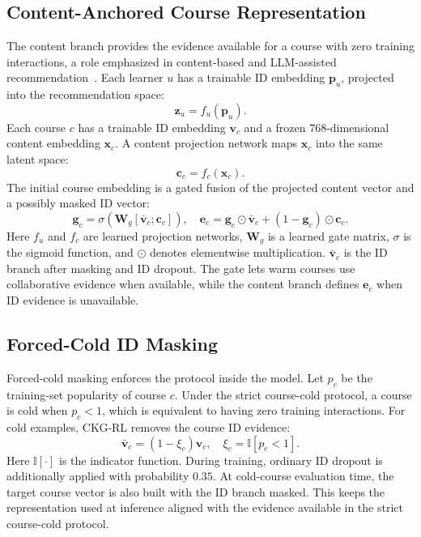 \documentclass[letterpaper]{article}
\begin{document}
\subsection{Content-Anchored Course Representation}
The content branch provides the evidence available for a course with zero training interactions, a role emphasized in content-based and LLM-assisted recommendation~\cite{liu2024once,wu2024llmrec}. Each learner \(u\) has a trainable ID embedding \(\mathbf{p}_u\), projected into the recommendation space:
\begin{equation}
\mathbf{z}_u=f_u(\mathbf{p}_u).
\end{equation}
Each course \(c\) has a trainable ID embedding \(\mathbf{v}_c\) and a frozen 768-dimensional content embedding \(\mathbf{x}_c\). A content projection network maps \(\mathbf{x}_c\) into the same latent space:
\begin{equation}
\mathbf{c}_c=f_c(\mathbf{x}_c).
\end{equation}
The initial course embedding is a gated fusion of the projected content vector and a possibly masked ID vector:
\begin{equation}
\mathbf{g}_c=\sigma\left(\mathbf{W}_g[\bar{\mathbf{v}}_c;\mathbf{c}_c]\right),
\quad
\mathbf{e}_c=\mathbf{g}_c\odot \bar{\mathbf{v}}_c+(1-\mathbf{g}_c)\odot \mathbf{c}_c.
\end{equation}
Here \(f_u\) and \(f_c\) are learned projection networks, \(\mathbf{W}_g\) is a learned gate matrix, \(\sigma\) is the sigmoid function, and \(\odot\) denotes elementwise multiplication. \(\bar{\mathbf{v}}_c\) is the ID branch after masking and ID dropout. The gate lets warm courses use collaborative evidence when available, while the content branch defines \(\mathbf{e}_c\) when ID evidence is unavailable.

\subsection{Forced-Cold ID Masking}
Forced-cold masking enforces the protocol inside the model. Let \(p_c\) be the training-set popularity of course \(c\). Under the strict course-cold protocol, a course is cold when \(p_c<1\), which is equivalent to having zero training interactions. For cold examples, CKG-RL removes the course ID evidence:
\begin{equation}
\bar{\mathbf{v}}_c=(1-\xi_c)\mathbf{v}_c,
\quad
\xi_c=\mathbb{I}[p_c<1].
\label{eq:cold-mask}
\end{equation}
Here \(\mathbb{I}[\cdot]\) is the indicator function. During training, ordinary ID dropout is additionally applied with probability \(0.35\). At cold-course evaluation time, the target course vector is also built with the ID branch masked. This keeps the representation used at inference aligned with the evidence available in the strict course-cold protocol.
\end{document}

